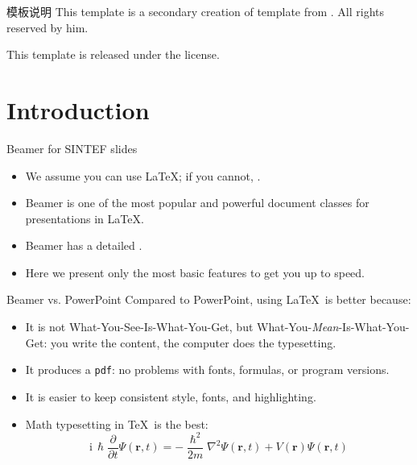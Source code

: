 \begin{frame}{模板说明}
This template is a secondary creation of  template from . All rights reserved by him.

This template is released under the  license.
\end{frame}

\section{Introduction}

\begin{frame}{Beamer for SINTEF slides}
\begin{itemize}
\item We assume you can use \LaTeX; if you cannot, .
\item Beamer is one of the most popular and powerful document classes for presentations in \LaTeX.
\item Beamer has a detailed .
\item Here we present only the most basic features to get you up to speed.
\end{itemize}
\end{frame}

\begin{frame}{Beamer vs. PowerPoint}
Compared to PowerPoint, using \LaTeX\ is better because:
\begin{itemize}
\item It is not What-You-See-Is-What-You-Get, but What-You-\emph{Mean}-Is-What-You-Get: you write the content, the computer does the typesetting.
\item It produces a \texttt{pdf}: no problems with fonts, formulas, or program versions.
\item It is easier to keep consistent style, fonts, and highlighting.
\item Math typesetting in \TeX\ is the best:
\begin{equation*}
\mathrm{i}\,\hslash\frac{\partial}{\partial t}\Psi(\mathbf{r},t)=-\frac{\hslash^2}{2m}\nabla^2\Psi(\mathbf{r},t)+V(\mathbf{r})\Psi(\mathbf{r},t)
\end{equation*}
\end{itemize}
\end{frame}

